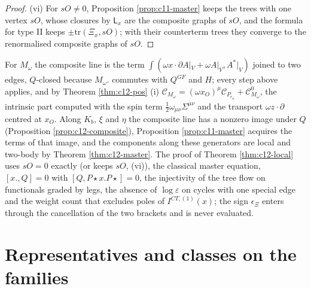 \begin{proof}
(vi) For $sO\neq0$, Proposition \ref{prop:c11-master} keeps the trees with one vertex $sO$, whose closures by $\mathsf L_x$ are the composite graphs of $sO$, and the formula for type II keeps $\pm\mathrm{tr}(\Xi_x,sO)$; with their counterterm trees they converge to the renormalised composite graphs of $sO$.
\end{proof}

\begin{remark}
\label{rem:c12-localM}
For $M_\omega$ the composite line is the term $\int(\omega x\cdot\partial A|_V+\omega A|_V,A^*|_V)$ joined to two edges, $Q$-closed because $M_\omega.$ commutes with $Q^{GF}$ and $H$; every step above applies, and by Theorem \ref{thm:c12-pos} (i) $\mathcal C_{M_\omega}=(\omega x_O)^\mu\mathcal C_{P_{e_\mu}}+\mathcal C^0_{M_\omega}$, the intrinsic part computed with the spin term $\tfrac12\omega_{\mu\nu}\Sigma^{\mu\nu}$ and the transport $\omega z\cdot\partial$ centred at $x_O$. Along $K_b$, $\xi$ and $\eta$ the composite line has a nonzero image under $Q$ (Proposition \ref{prop:c12-composite}), Proposition \ref{prop:c11-master} acquires the terms of that image, and the components along these generators are local and two-body by Theorem \ref{thm:c12-master}. The proof of Theorem \ref{thm:c12-local} uses $sO=0$ exactly (or keeps $sO$, (vi)), the classical master equation, $[x.,Q]=0$ with $[Q,P\star x.P\star]=0$, the injectivity of the tree flow on functionals graded by legs, the absence of $\log\varepsilon$ on cycles with one special edge and the weight count that excludes poles of $I^{CT,(1)}(x)$; the sign $\epsilon_\Xi$ enters through the cancellation of the two brackets and is never evaluated.
\end{remark}

\section{Representatives and classes on the families}

